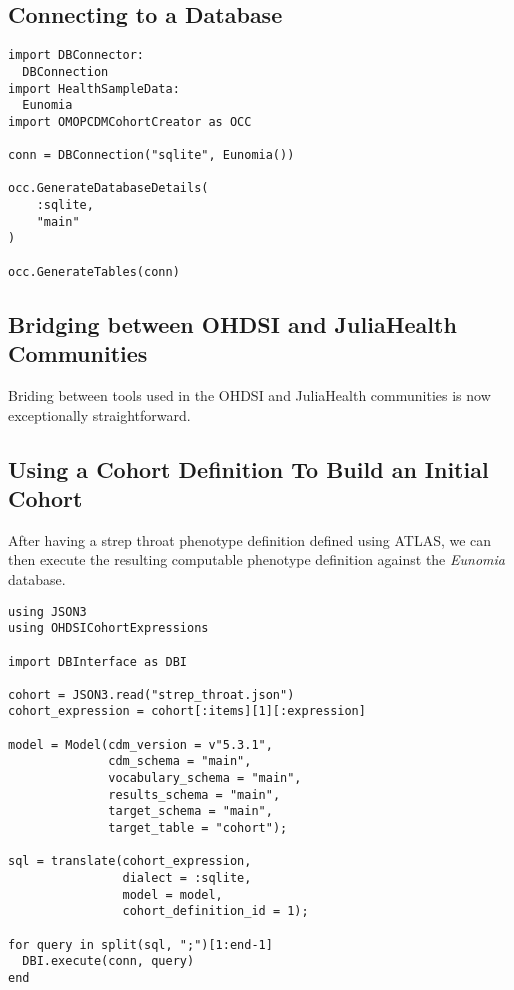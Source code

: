 \documentclass{juliacon}
\begin{document}
\subsection{Connecting to a Database}

\begin{verbatim}
import DBConnector: 
  DBConnection
import HealthSampleData: 
  Eunomia
import OMOPCDMCohortCreator as OCC

conn = DBConnection("sqlite", Eunomia())

occ.GenerateDatabaseDetails(
    :sqlite,
    "main"
)

occ.GenerateTables(conn)
\end{verbatim}

\subsection{Bridging between OHDSI and JuliaHealth Communities}

Briding between tools used in the OHDSI and JuliaHealth communities is now exceptionally straightforward.


\subsection{Using a Cohort Definition To Build an Initial Cohort}

After having a strep throat phenotype definition defined using ATLAS, we can then execute the resulting computable phenotype definition against the \textit{Eunomia} database.

\begin{verbatim}
using JSON3 
using OHDSICohortExpressions

import DBInterface as DBI

cohort = JSON3.read("strep_throat.json")
cohort_expression = cohort[:items][1][:expression]

model = Model(cdm_version = v"5.3.1", 
              cdm_schema = "main",
              vocabulary_schema = "main", 
              results_schema = "main",
              target_schema = "main", 
              target_table = "cohort");

sql = translate(cohort_expression, 
                dialect = :sqlite, 
                model = model, 
                cohort_definition_id = 1);

for query in split(sql, ";")[1:end-1]
  DBI.execute(conn, query)
end
\end{verbatim}
\end{document}
